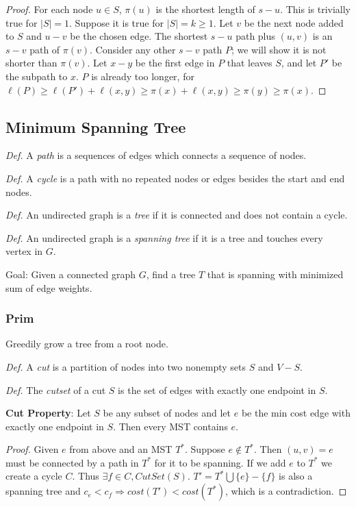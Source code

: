 \begin{proof}[Proof]
For each node $u \in S$, $\pi(u)$ is the shortest length of $s-u$. 
This is trivially true for $|S| = 1$. 
Suppose it is true for $|S| = k \geq 1$. 
Let $v$ be the next node added to $S$ and $u-v$ be the chosen edge.
The shortest $s-u$ path plus $(u,v)$ is an $s-v$ path of $\pi(v)$. 
Consider any other $s-v$ path $P$; we will show it is not shorter than $\pi(v)$. 
Let $x-y$ be the first edge in $P$ that leaves $S$, and let $P'$ be the subpath to $x$.
$P$ is already too longer, for $\ell(P) \geq \ell(P') + \ell(x,y) \geq \pi(x) + \ell(x,y) \geq \pi(y) \geq \pi(x)$. 	
\end{proof}

\subsection*{Minimum Spanning Tree}
\textit{Def.} A \textit{path} is a sequences of edges which connects a sequence of nodes.

\textit{Def.} A \textit{cycle} is a path with no repeated nodes or edges besides the start and end nodes.

\textit{Def.} An undirected graph is a \textit{tree} if it is connected and does not contain a cycle.

\textit{Def.} An undirected graph is a \textit{spanning tree} if it is a tree and touches every vertex in $G$. 

Goal: Given a connected graph $G$, find a tree $T$ that is spanning with minimized sum of edge weights.

\subsubsection*{Prim}
Greedily grow a tree from a root node. 

\textit{Def.} A \textit{cut} is a partition of nodes into two nonempty sets $S$ and $V - S$.

\textit{Def.} The \textit{cutset} of a cut $S$ is the set of edges with exactly one endpoint in $S$.

\textbf{Cut Property}: Let $S$ be any subset of nodes and let $e$ be the min cost edge with exactly one endpoint in $S$.
Then every MST contains $e$. 

\begin{proof}[Proof]
Given $e$ from above and an MST $T^*$.
Suppose $e \notin T^*$. 
Then $(u,v) = e$ must be connected by a path in $T^*$ for it to be spanning.
If we add $e$ to $T^*$ we create a cycle $C$. 
Thus $\exists f \in C, CutSet(S)$.
$T' = T^* \bigcup \{e\} - \{f\}$ is also a spanning tree and $c_e < c_f \Rightarrow cost(T') < cost(T^*)$, which is a contradiction.  	
\end{proof}

